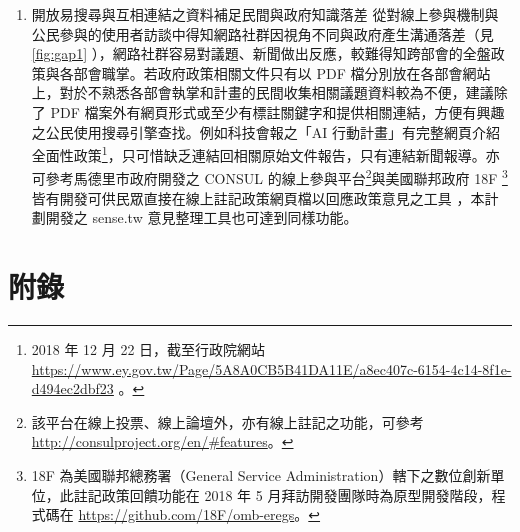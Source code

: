 \documentclass[12pt,a4paper]{article}
\begin{document}
\begin{enumerate}
\item 開放易搜尋與互相連結之資料補足民間與政府知識落差
\label{sec:org5ca34c4}
從對線上參與機制與公民參與的使用者訪談中得知網路社群因視角不同與政府產生溝通落差（見 \ref{fig:gap1} ），網路社群容易對議題、新聞做出反應，較難得知跨部會的全盤政策與各部會職掌。若政府政策相關文件只有以 PDF 檔分別放在各部會網站上，對於不熟悉各部會執掌和計畫的民間收集相關議題資料較為不便，建議除了 PDF 檔案外有網頁形式或至少有標註關鍵字和提供相關連結，方便有興趣之公民使用搜尋引擎查找。例如科技會報之「AI 行動計畫」有完整網頁介紹全面性政策\footnote{2018 年 12 月 22 日，截至行政院網站 \url{https://www.ey.gov.tw/Page/5A8A0CB5B41DA11E/a8ec407c-6154-4c14-8f1e-d494ec2dbf23} 。}，只可惜缺乏連結回相關原始文件報告，只有連結新聞報導。亦可參考馬德里市政府開發之 CONSUL 的線上參與平台\footnote{該平台在線上投票、線上論壇外，亦有線上註記之功能，可參考 \url{http://consulproject.org/en/\#features}。}與美國聯邦政府 18F \footnote{18F 為美國聯邦總務署（General Service Administration）轄下之數位創新單位，此註記政策回饋功能在 2018 年 5 月拜訪開發團隊時為原型開發階段，程式碼在 \url{https://github.com/18F/omb-eregs}。}皆有開發可供民眾直接在線上註記政策網頁檔以回應政策意見之工具
，本計劃開發之 sense.tw 意見整理工具也可達到同樣功能。
\end{enumerate}
\section{附錄}
\label{sec:orgf1631a9}
\end{document}
